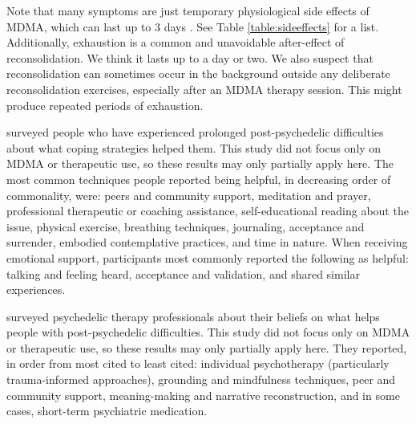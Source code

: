 \documentclass[12pt,letterpaper]{book}
\begin{document}
Note that many symptoms are just temporary physiological side effects of MDMA, which can last up to 3 days \cite{liechtiGender}. See Table \ref{table:sideeffects} for a list. Additionally, exhaustion is a common and unavoidable after-effect of reconsolidation. We think it lasts up to a day or two. We also suspect that reconsolidation can sometimes occur in the background outside any deliberate reconsolidation exercises, especially after an MDMA therapy session. This might produce repeated periods of exhaustion.

\textcite{robinson2024coming} surveyed people who have experienced prolonged post-psychedelic difficulties about what coping strategies helped them. This study did not focus only on MDMA or therapeutic use, so these results may only partially apply here. The most common techniques people reported being helpful, in decreasing order of commonality, were: peers and community support, meditation and prayer, professional therapeutic or coaching assistance, self-educational reading about the issue, physical exercise, breathing techniques, journaling, acceptance and surrender, embodied contemplative practices, and time in nature. When receiving emotional support, participants most commonly reported the following as helpful: talking and feeling heard, acceptance and validation, and shared similar experiences.

\textcite{argyri2025practitioner} surveyed psychedelic therapy professionals about their beliefs on what helps people with post-psychedelic difficulties. This study did not focus only on MDMA or therapeutic use, so these results may only partially apply here. They reported, in order from most cited to least cited: individual psychotherapy (particularly trauma-informed approaches), grounding and mindfulness techniques, peer and community support, meaning-making and narrative reconstruction, and in some cases, short-term psychiatric medication.
\end{document}
